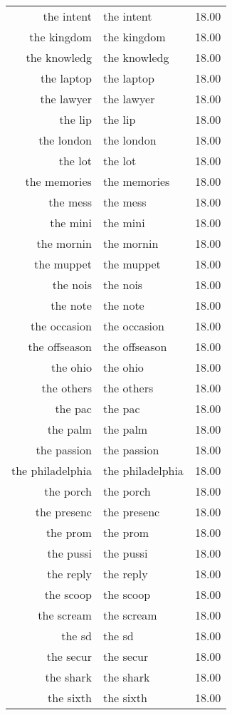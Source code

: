 \begin{table}[ht]
\begin{tabular}{rlr}
  the intent & the intent & 18.00 \\ 
  the kingdom & the kingdom & 18.00 \\ 
  the knowledg & the knowledg & 18.00 \\ 
  the laptop & the laptop & 18.00 \\ 
  the lawyer & the lawyer & 18.00 \\ 
  the lip & the lip & 18.00 \\ 
  the london & the london & 18.00 \\ 
  the lot & the lot & 18.00 \\ 
  the memories & the memories & 18.00 \\ 
  the mess & the mess & 18.00 \\ 
  the mini & the mini & 18.00 \\ 
  the mornin & the mornin & 18.00 \\ 
  the muppet & the muppet & 18.00 \\ 
  the nois & the nois & 18.00 \\ 
  the note & the note & 18.00 \\ 
  the occasion & the occasion & 18.00 \\ 
  the offseason & the offseason & 18.00 \\ 
  the ohio & the ohio & 18.00 \\ 
  the others & the others & 18.00 \\ 
  the pac & the pac & 18.00 \\ 
  the palm & the palm & 18.00 \\ 
  the passion & the passion & 18.00 \\ 
  the philadelphia & the philadelphia & 18.00 \\ 
  the porch & the porch & 18.00 \\ 
  the presenc & the presenc & 18.00 \\ 
  the prom & the prom & 18.00 \\ 
  the pussi & the pussi & 18.00 \\ 
  the reply & the reply & 18.00 \\ 
  the scoop & the scoop & 18.00 \\ 
  the scream & the scream & 18.00 \\ 
  the sd & the sd & 18.00 \\ 
  the secur & the secur & 18.00 \\ 
  the shark & the shark & 18.00 \\ 
  the sixth & the sixth & 18.00 \\ 

\end{tabular}
\end{table}
